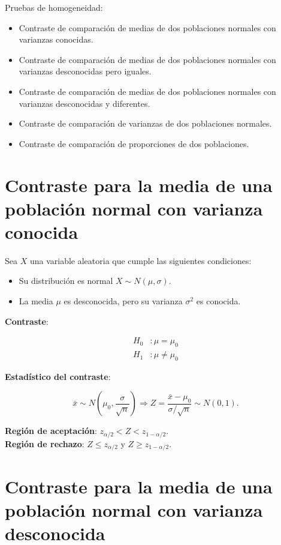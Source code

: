 \documentclass[
  a4paper,
]{scrreport}
\providecommand{\tightlist}{%
  \setlength{\itemsep}{0pt}\setlength{\parskip}{0pt}}\usepackage{longtable,booktabs,array}
\theoremstyle{plain}
\theoremstyle{definition}
\theoremstyle{definition}
\theoremstyle{remark}
\begin{document}
Pruebas de homogeneidad:

\begin{itemize}
\tightlist
\item
  Contraste de comparación de medias de dos poblaciones normales con
  varianzas conocidas.
\item
  Contraste de comparación de medias de dos poblaciones normales con
  varianzas desconocidas pero iguales.
\item
  Contraste de comparación de medias de dos poblaciones normales con
  varianzas desconocidas y diferentes.
\item
  Contraste de comparación de varianzas de dos poblaciones normales.
\item
  Contraste de comparación de proporciones de dos poblaciones.
\end{itemize}

\section{Contraste para la media de una población normal con varianza
conocida}\label{contraste-para-la-media-de-una-poblaciuxf3n-normal-con-varianza-conocida}

Sea \(X\) una variable aleatoria que cumple las siguientes condiciones:

\begin{itemize}
\tightlist
\item
  Su distribución es normal \(X\sim N(\mu,\sigma)\).
\item
  La media \(\mu\) es desconocida, pero su varianza \(\sigma^2\) es
  conocida.
\end{itemize}

\textbf{Contraste}:

\begin{align*}
H_0 &: \mu=\mu_0 \\
H_1 &: \mu\neq \mu_0\end{align*}

\textbf{Estadístico del contraste}:

\[
\bar x\sim N\left(\mu_0,\frac{\sigma}{\sqrt{n}}\right) \Rightarrow Z=\frac{\bar x-\mu_0}{\sigma/\sqrt{n}}\sim N(0,1).
\]

\textbf{Región de aceptación}: \(z_{\alpha/2}< Z < z_{1-\alpha/2}\).\\
\textbf{Región de rechazo}: \(Z\leq z_{\alpha/2}\) y
\(Z\geq z_{1-\alpha/2}\).

\section{Contraste para la media de una población normal con varianza
desconocida}\label{contraste-para-la-media-de-una-poblaciuxf3n-normal-con-varianza-desconocida}
\end{document}
